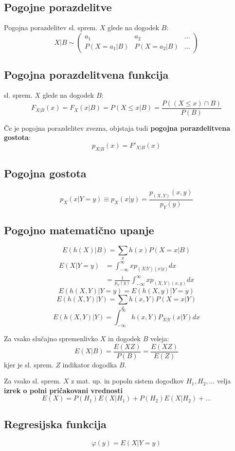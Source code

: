 \begin{multicols}{5}
\section{Pogojne porazdelitve}
Pogojna porazdelitev sl. sprem. $X$ glede na dogodek $B$:
\[ X|B \sim \left( \begin{matrix}
	a_1 & a_2 &\dots \\
	P(X = a_1 | B) & P(X = a_2 | B) &\dots 
\end{matrix}\right)\]

\subsection{Pogojna porazdelitvena funkcija}
sl. sprem. $X$ glede na dogodek $B$:
\[ F_{X|B}(x) = F_X(x|B) = P(X \leq x | B) = \frac{P((X\leq x) \cap B)}{P(B)} \]

Če je pogojna porazdelitev zvezna, objstaja tudi \textbf{pogojna porazdelitvena gostota}:
\[ p_{X|B}(x) = F'_{X|B}(x)\]

\subsection{Pogojna gostota}
\[p_X(x|Y=y) \equiv p_X(x|y) = \frac{p_{(X,Y)}(x,y)}{p_Y(y)}\]

\subsection{Pogojno matematično upanje}
\[ E(h(X) | B) = \sum_x h(x) P(X = x | B)\]
\begin{align*}
	E(X|Y=y) &= \int_{-\infty}^\infty x p_{(X|Y)(x|y)} dx \\
	&= \frac{1}{p_Y(y)} \int_{-\infty}^\infty x p_{(X,Y)(x,y)} dx
\end{align*}
\[ E(h(X,Y) |Y=y) = E(h(X,y) | Y=y ) \]
\[ E(h(X,Y) | Y) = \sum_x h(x,Y) P(X=x |Y)\]
\[ E(h(X,Y) | Y) = \int_{-\infty}^{\infty} h(x,Y) P_{X|Y}(x|Y) dx \]

Za vsako slučajno spremenlivko $X$ in dogodek $B$ veleja:
\[ E(X |B) = \frac{E(XZ)}{P(B)} = \frac{E(XZ)}{E(Z)}\]
kjer je sl. sprem. $Z$ indikator dogodka $B$.

Za vsako sl. sprem. $X$ z mat. up. in popoln sistem dogodkov $H_1, H_2, \dots$ velja \textbf{izrek o polni pričakovani vrednosti}
\[E(X) = P(H_1)E(X | H_1) + P(H_2)E(X | H_2)+\dots \]

\subsection{Regresijska funkcija}
\[ \varphi(y) = E(X | Y = y) \]


\end{multicols}
